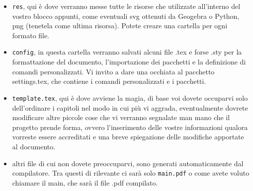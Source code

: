 \begin{itemize}
\begin{itemize}
	\end{itemize}
	\item \texttt{res}, qui è dove verranno messe tutte le risorse che utilizzate all'interno del vostro blocco appunti, come eventuali svg ottenuti da Geogebra o Python, png (tenetela come ultima risorsa). Potete creare una cartella per ogni formato file.
	\item \texttt{config}, in questa cartella verranno salvati alcuni file .tex e forse .sty per la formattazione del documento, l'importazione dei pacchetti e la definizione di comandi personalizzati. Vi invito a dare una occhiata al pacchetto settings.tex, che contiene i comandi personalizzati e i pacchetti.
	\item \texttt{template.tex}, qui è dove avviene la magia, di base voi dovete occuparvi solo dell'ordinare i capitoli nel modo in cui più vi aggrada, eventualmente dovrete modificare altre piccole cose che vi verranno segnalate man mano che il progetto prende forma, ovvero l'inserimento delle vostre informazioni qualora vorreste essere accreditati e una breve spiegazione delle modifiche apportate al documento.
	\item altri file di cui non dovete preoccuparvi, sono generati automaticamente dal compilatore. Tra questi di rilevante ci sarà solo \texttt{main.pdf} o come avete voluto chiamare il main, che sarà il file .pdf compilato.
\end{itemize}
